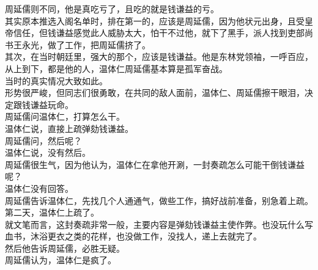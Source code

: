 \begin{multicols}{\theparacolNo}
周延儒则不同，他是真吃亏了，且吃的就是钱谦益的亏。\\

其实原本推选入阁名单时，排在第一的，应该是周延儒，因为他状元出身，且受皇帝信任，但钱谦益感觉此人威胁太大，怕干不过他，就下了黑手，派人找到吏部尚书王永光，做了工作，把周延儒挤了。\\

其次，在当时朝廷里，强大的那个，应该是钱谦益。他是东林党领袖，一呼百应，从上到下，都是他的人，温体仁周延儒基本算是孤军奋战。\\

当时的真实情况大致如此。\\

形势很严峻，但同志们很勇敢，在共同的敌人面前，温体仁、周延儒擦干眼泪，决定跟钱谦益玩命。\\

周延儒问温体仁，打算怎么干。\\

温体仁说，直接上疏弹劾钱谦益。\\

周延儒问，然后呢？\\

温体仁说，没有然后。\\

周延儒很生气，因为他认为，温体仁在拿他开涮，一封奏疏怎么可能干倒钱谦益呢？\\

温体仁没有回答。\\

周延儒告诉温体仁，先找几个人通通气，做些工作，搞好战前准备，别急着上疏。\\

第二天，温体仁上疏了。\\

就文笔而言，这封奏疏非常一般，主要内容是弹劾钱谦益主使作弊。也没玩什么写血书，沐浴更衣之类的花样，也没做工作，没找人，递上去就完了。\\

然后他告诉周延儒，必胜无疑。\\

周延儒认为，温体仁是疯了。\\
\ifnum{}
	\end{multicols}
\fi
\newpage
